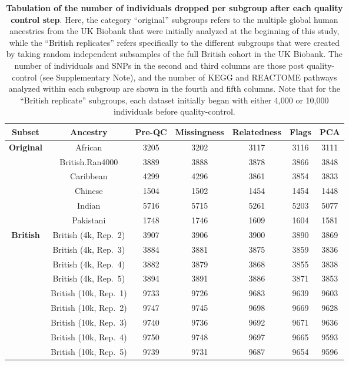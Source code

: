 \documentclass[10pt]{article}
\begin{document}
\begin{table}[ht]
\centering
\begin{tabular}{|c|c|c|c|c|c|c|}
  \hline
 \textbf{Subset} & \textbf{Ancestry} & \textbf{Pre-QC} & \textbf{Missingness} & \textbf{Relatedness} & \textbf{Flags} & \textbf{PCA} \\
  [2pt]\hline
\multirow{6.5}{*}{\textbf{Original}} & African & 3205 & 3202 & 3117 & 3116 & 3111 \\ [2pt]
  & British.Ran4000 & 3889 & 3888 & 3878 & 3866 & 3848 \\ [2pt]
  & Caribbean & 4299 & 4296 & 3861 & 3854 & 3833 \\ [2pt]
  & Chinese & 1504 & 1502 & 1454 & 1454 & 1448 \\ [2pt]
  & Indian & 5716 & 5715 & 5261 & 5203 & 5077 \\ [2pt]
  & Pakistani & 1748 & 1746 & 1609 & 1604 & 1581 \\ [2pt] \hline
  \multirow{9.5}{*}{\textbf{British}} & British (4k, Rep.~2) & 3907 & 3906 & 3900 & 3890 & 3869 \\ [2pt]
  & British (4k, Rep.~3) & 3884 & 3881 & 3875 & 3859 & 3836 \\ [2pt]
  & British (4k, Rep.~4) & 3882 & 3879 & 3868 & 3855 & 3838 \\ [2pt]
  & British (4k, Rep.~5) & 3894 & 3891 & 3886 & 3871 & 3853 \\ [2pt]
  & British (10k, Rep.~1) & 9733 & 9726 & 9683 & 9639 & 9603 \\ [2pt]
  & British (10k, Rep.~2) & 9747 & 9745 & 9698 & 9669 & 9628 \\ [2pt]
  & British (10k, Rep.~3) & 9740 & 9736 & 9692 & 9671 & 9636 \\ [2pt]
  & British (10k, Rep.~4) & 9750 & 9748 & 9697 & 9665 & 9593 \\ [2pt]
  & British (10k, Rep.~5) & 9739 & 9731 & 9687 & 9654 & 9596 \\ [2pt]
   \hline
\end{tabular}
\caption{\textbf{Tabulation of the number of individuals dropped per subgroup after each quality control step}. Here, the category ``original'' subgroups refers to the multiple global human ancestries from the UK Biobank that were initially analyzed at the beginning of this study, while the ``British replicates'' refers specifically to the different subgroups that were created by taking random independent subsamples of the full British cohort in the UK Biobank. 
The number of individuals and SNPs in the second and third columns are those post quality-control (see Supplementary Note), and the number of KEGG and REACTOME pathways analyzed within each subgroup are shown in the fourth and fifth columns. Note that for the ``British replicate'' subgroups, each dataset initially began with either 4,000 or 10,000 individuals before quality-control.}
\label{InterPath-Supp-Table-UKBQCStats}
\end{table}
\end{document}
